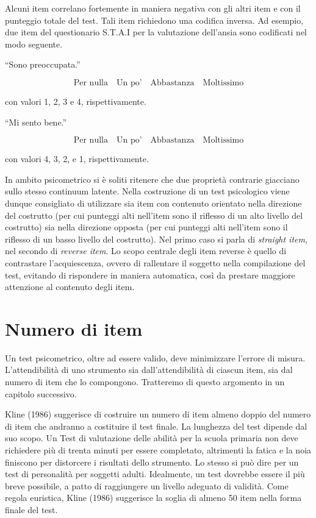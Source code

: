 \documentclass[
  11pt,
]{krantz}
\theoremstyle{definition}
\theoremstyle{definition}
\theoremstyle{definition}
\theoremstyle{definition}
\theoremstyle{remark}
\begin{document}
Alcuni item correlano fortemente in maniera negativa con gli altri item e con il punteggio totale del test. Tali item richiedono una codifica inversa. Ad esempio, due item del questionario S.T.A.I per la valutazione dell'ansia sono codificati nel modo seguente.

``Sono preoccupata.''

\[\text{Per nulla} \quad \text{Un po'}\quad \text{Abbastanza} \quad \text{Moltissimo}\]

con valori 1, 2, 3 e 4, rispettivamente.

``Mi sento bene.''

\[\text{Per nulla} \quad \text{Un po'}\quad \text{Abbastanza} \quad \text{Moltissimo}\]

con valori 4, 3, 2, e 1, rispettivamente.

In ambito psicometrico si è soliti ritenere che due proprietà contrarie giacciano sullo stesso continuum latente. Nella costruzione di un test psicologico viene dunque consigliato di utilizzare sia item con contenuto orientato nella direzione del costrutto (per cui punteggi alti nell'item sono il riflesso di un alto livello del costrutto) sia nella direzione opposta (per cui punteggi alti nell'item sono il riflesso di un basso livello del costrutto). Nel primo caso si parla di \emph{straight item}, nel secondo di \emph{reverse item}. Lo scopo centrale degli item reverse è quello di contrastare l'acquiescenza, ovvero di rallentare il soggetto nella compilazione del test, evitando di rispondere in maniera automatica, così da prestare maggiore attenzione al contenuto degli item.

\hypertarget{numero-di-item}{%
\section{Numero di item}\label{numero-di-item}}

Un test psicometrico, oltre ad essere valido, deve minimizzare l'errore di misura. L'attendibilità di uno strumento sia dall'attendibilità di ciascun item, sia dal numero di item che lo compongono. Tratteremo di questo argomento in un capitolo successivo.

Kline (1986) suggerisce di costruire un numero di item almeno doppio del numero di item che andranno a costituire il test finale. La lunghezza del test dipende dal suo scopo. Un Test di valutazione delle abilità per la scuola primaria non deve richiedere più di trenta minuti per essere completato, altrimenti la fatica e la noia finiscono per distorcere i risultati dello strumento. Lo stesso si può dire per un test di personalità per soggetti adulti. Idealmente, un test dovrebbe essere il più breve possibile, a patto di raggiungere un livello adeguato di validità. Come regola euristica, Kline (1986) suggerisce la soglia di almeno 50 item nella forma finale del test.
\end{document}
